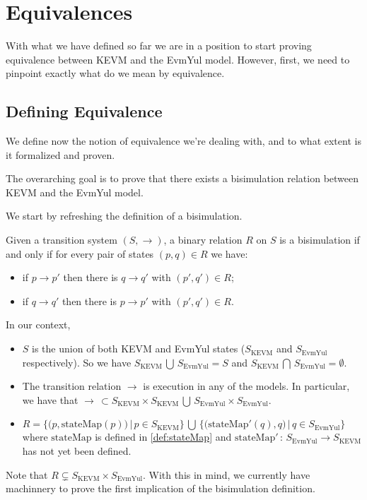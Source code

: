 \chapter{Equivalences}

With what we have defined so far we are in a position to start proving
equivalence between KEVM and the EvmYul model. However, first, we need to
pinpoint exactly what do we mean by equivalence.

\section{Defining Equivalence}

We define now the notion of equivalence we're dealing with, and to what extent
is it formalized and proven.

The overarching goal is to prove that there exists a bisimulation relation between
KEVM and the EvmYul model.

We start by refreshing the definition of a bisimulation.

\begin{definition}\label{def:bisimulation}
Given a transition system $(S, \rightarrow)$, a binary relation $R$ on $S$ is a
bisimulation if and only if for every pair of states $(p, q)\in R$ we have:
\begin{itemize}
\item if $p \rightarrow p'$ then there is $q \rightarrow q'$ with $(p', q') \in
  R$;
\item if $q \rightarrow q'$ then there is $p \rightarrow p'$ with $(p', q') \in
  R$.
\end{itemize}
\end{definition}

In our context,
\begin{itemize}
\item $S$ is the union of both KEVM and EvmYul states ($S_{\text{KEVM}}$ and
  $S_{\text{EvmYul}}$ respectively). So we have $S_{\text{KEVM}}\, \bigcup\, S_{\text{EvmYul}} = S$ and $S_{\text{KEVM}}\, \bigcap\, S_{\text{EvmYul}} = \emptyset$.
\item The transition relation $\rightarrow$ is execution in any of the models. In particular, we have that $\rightarrow\,
\subset S_{\text{KEVM}} \times S_{\text{KEVM}} \,\bigcup\, S_{\text{EvmYul}} \times S_{\text{EvmYul}}$.
\item $R = \bigl\{\bigl( p, \text{stateMap}(p) \bigr)\, |\, p\in S_{\text{KEVM}}\bigr\} \,\bigcup\, \bigl\{\bigl(\text{stateMap}'(q),
  q\bigr)\, |\, q\in S_{\text{EvmYul}}\bigr\}$ where $\text{stateMap}$ is
  defined in \ref{def:stateMap} and $\text{stateMap}'\,:\,
  S_{\text{EvmYul}}\rightarrow S_{\text{KEVM}}$ has not yet been defined.

\end{itemize}
Note that $R \subsetneq S_{\text{KEVM}}\times S_{\text{EvmYul}}$.
With this in mind, we currently have machinnery to prove the first implication
of the bisimulation definition.

